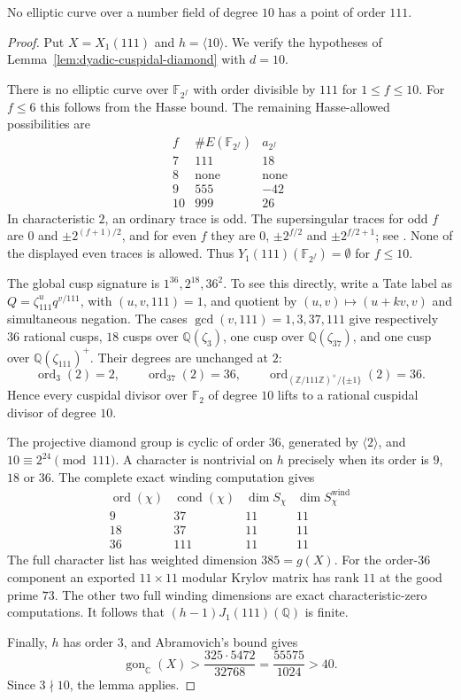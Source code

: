 \begin{proposition}\label{prop:decic111-excluded}
No elliptic curve over a number field of degree $10$ has a point
of order $111$.
\end{proposition}
\begin{proof}
Put $X=X_1(111)$ and $h=\langle10\rangle$.
We verify the hypotheses of Lemma~\ref{lem:dyadic-cuspidal-diamond}
with $d=10$.

There is no elliptic curve over $\mathbb F_{2^f}$ with order
divisible by $111$ for $1\leq f\leq10$.
For $f\leq6$ this follows from the Hasse bound.
The remaining Hasse-allowed possibilities are
\[
\begin{array}{c|c|c}
f&\#E(\mathbb F_{2^f})&a_{2^f}\\\hline
7&111&18\\
8&\text{none}&\text{none}\\
9&555&-42\\
10&999&26
\end{array}
\]
In characteristic $2$, an ordinary trace is odd.
The supersingular traces for odd $f$ are $0$ and
$\pm2^{(f+1)/2}$, and for even $f$ they are
$0$, $\pm2^{f/2}$ and $\pm2^{f/2+1}$;
see \cite[Theorem~4.1]{Waterhouse}.
None of the displayed even traces is allowed.
Thus $Y_1(111)(\mathbb F_{2^f})=\emptyset$ for $f\leq10$.

The global cusp signature is $1^{36},2^{18},36^2$.
To see this directly, write a Tate label as
$Q=\zeta_{111}^u q^{v/111}$, with $(u,v,111)=1$,
and quotient by $(u,v)\mapsto(u+kv,v)$ and simultaneous negation.
The cases $\gcd(v,111)=1,3,37,111$ give respectively
$36$ rational cusps, $18$ cusps over $\mathbb Q(\zeta_3)$,
one cusp over $\mathbb Q(\zeta_{37})$, and one cusp over
$\mathbb Q(\zeta_{111})^+$.
Their degrees are unchanged at $2$:
\[
 \operatorname{ord}_{3}(2)=2,\qquad
 \operatorname{ord}_{37}(2)=36,\qquad
 \operatorname{ord}_{(\mathbb Z/111\mathbb Z)^\times/\{\pm1\}}(2)=36.
\]
Hence every cuspidal divisor over $\mathbb F_2$ of degree $10$
lifts to a rational cuspidal divisor of degree $10$.

The projective diamond group is cyclic of order $36$, generated
by $\langle2\rangle$, and $10\equiv2^{24}\pmod {111}$.
A character is nontrivial on $h$ precisely when its order is
$9$, $18$ or $36$.
The complete exact winding computation gives
\[
\begin{array}{c|c|c|c}
\operatorname{ord}(\chi)&\operatorname{cond}(\chi)&
\dim S_\chi&\dim S_\chi^{\mathrm{wind}}\\\hline
9&37&11&11\\
18&37&11&11\\
36&111&11&11
\end{array}
\]
The full character list has weighted dimension $385=g(X)$.
For the order-$36$ component an exported $11\times11$ modular
Krylov matrix has rank $11$ at the good prime $73$.
The other two full winding dimensions are exact characteristic-zero
computations. It follows that $(h-1)J_1(111)(\mathbb Q)$ is finite.

Finally, $h$ has order $3$, and Abramovich's bound gives
\[
 \operatorname{gon}_{\mathbb C}(X)>
 \frac{325\cdot5472}{32768}
 =\frac{55575}{1024}>40.
\]
Since $3\nmid10$, the lemma applies.
\end{proof}
